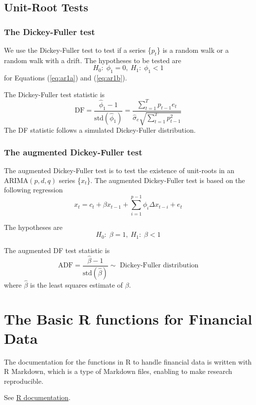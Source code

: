\documentclass[a4paper,11pt]{article}
\begin{document}
\subsection{Unit-Root Tests}
\label{sec:org0c6113e}

\subsubsection*{The Dickey-Fuller test}
\label{sec:org87c3067}

We use the Dickey-Fuller test to test if a series \{\(p_t\)\} is a random
walk or a random walk with a drift. The hypotheses to be tested are
\[H_0:\; \phi_1 = 0,\: H_1:\; \phi_1 < 1  \]
for Equations (\ref{eq:ar1a}) and (\ref{eq:ar1b}).

The Dickey-Fuller test statistic is
\begin{equation}
\label{eq:df-test}
\mathrm{DF} = \frac{\hat{\phi}_1 - 1}{\mathrm{std}(\hat{\phi}_1)} = \frac{\sum_{t=1}^T p_{t-1} e_t}{\hat{\sigma}_e \sqrt{\sum_{t=1}^T p^2_{t-1}}}
\end{equation}
The DF statistic follows a simulated Dickey-Fuller distribution.

\subsubsection*{The augmented Dickey-Fuller test}
\label{sec:org2689644}

The augmented Dickey-Fuller test is to test the existence of
unit-roots in an \(\mathrm{ARIMA}(p, d, q)\) series \{\(x_t\)\}. The
augmented Dickey-Fuller test is based on the following regression
\[
x_t = c_t + \beta x_{t-1} + \sum_{i=1}^{p-1} \phi_i \Delta x_{t-i} +
e_t \]

The hypotheses are
\[H_0:\; \beta = 1,\: H_1:\; \beta < 1\]

The augmented DF test statistic is
\[ \mathrm{ADF} = \frac{\hat{\beta}-1}{\mathrm{std}(\hat{\beta})} \sim
\text{ Dickey-Fuller distribution}\]
where \(\hat{\beta}\) is the least squares estimate of \(\beta\).


\section{The Basic R functions for Financial Data}
\label{sec:org3d670b2}

The documentation for the functions in R to handle financial data is
written with R Markdown, which is a type of Markdown files, enabling
to make research reproducible.

See \href{rdocs/lecture\_1\_R.pdf}{R documentation}.
\end{document}

